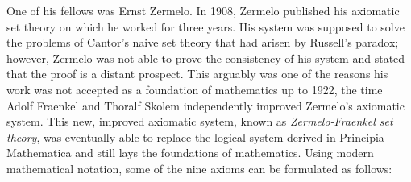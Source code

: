 \documentclass{article}
\begin{document}
One of his fellows was Ernst Zermelo. In 1908, Zermelo published his axiomatic set theory on which he worked for three years. His system was supposed to solve the problems of Cantor's naive set theory that had arisen by Russell's paradox; however, Zermelo was not able to prove the consistency of his system and stated that the proof is a distant prospect. This arguably was one of the reasons his work was not accepted as a foundation of mathematics up to 1922, the time Adolf Fraenkel and Thoralf Skolem independently improved Zermelo's axiomatic system.
This new, improved axiomatic system, known as \textit{Zermelo-Fraenkel set theory}, was eventually able to replace the logical system derived in Principia Mathematica and still lays the foundations of mathematics. Using modern mathematical notation, some of the nine axioms can be formulated as follows:
\newpage
\small
\end{document}
